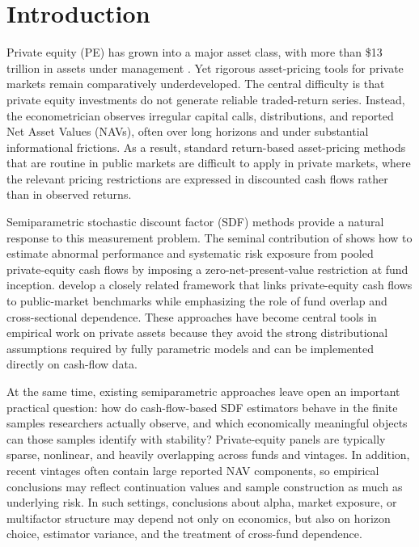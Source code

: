 \section{Introduction}
\label{sec:introduction}

Private equity (PE) has grown into a major asset class, with more than \$13 trillion in assets under management \citep{McKinsey2024}. 
Yet rigorous asset-pricing tools for private markets remain comparatively underdeveloped. The central difficulty is that private equity investments do not generate reliable traded-return series. 
Instead, the econometrician observes irregular capital calls, distributions, and reported Net Asset Values (NAVs), often over long horizons and under substantial informational frictions. 
As a result, standard return-based asset-pricing methods that are routine in public markets are difficult to apply in private markets, where the relevant pricing restrictions are expressed in discounted cash flows rather than in observed returns.

Semiparametric stochastic discount factor (SDF) methods provide a natural response to this measurement problem. 
The seminal contribution of \citet{DLP12} shows how to estimate abnormal performance and systematic risk exposure from pooled private-equity cash flows by imposing a zero-net-present-value restriction at fund inception. 
\citet{KN16} develop a closely related framework that links private-equity cash flows to public-market benchmarks while emphasizing the role of fund overlap and cross-sectional dependence. 
These approaches have become central tools in empirical work on private assets because they avoid the strong distributional assumptions required by fully parametric models and can be implemented directly on cash-flow data.

At the same time, existing semiparametric approaches leave open an important practical question: how do cash-flow-based SDF estimators behave in the finite samples researchers actually observe, and which economically meaningful objects can those samples identify with stability? 
Private-equity panels are typically sparse, nonlinear, and heavily overlapping across funds and vintages. 
In addition, recent vintages often contain large reported NAV components, so empirical conclusions may reflect continuation values and sample construction as much as underlying risk. 
In such settings, conclusions about alpha, market exposure, or multifactor structure may depend not only on economics, but also on horizon choice, estimator variance, and the treatment of cross-fund dependence.

